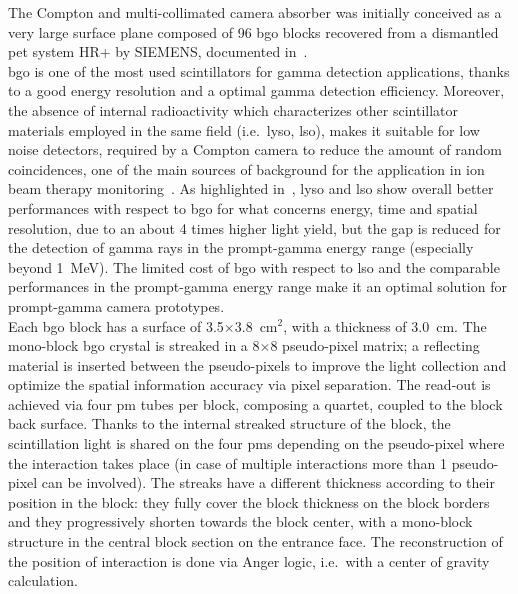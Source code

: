 The Compton and multi-collimated camera absorber was initially conceived as a very large surface plane composed of 96 \gls{bgo} blocks recovered from a dismantled \gls{pet} system HR+ by SIEMENS, documented in~\parencite{Adam1997, Brix1997}.\\ 
\gls{bgo} is one of the most used scintillators for gamma detection applications, thanks to a good energy resolution and a optimal gamma detection efficiency. Moreover, the absence of internal radioactivity which characterizes other scintillator materials employed in the same field (i.e.~\gls{lyso}, \gls{lso}), makes it suitable for low noise detectors, required by a Compton camera to reduce the amount of random coincidences, one of the main sources of background for the application in ion beam therapy monitoring~\parencite{Ortega2015}. As highlighted in~\parencite{HuesoGonzalez2015}, \gls{lyso} and \gls{lso} show overall better performances with respect to \gls{bgo} for what concerns energy, time and spatial resolution, due to an about 4 times higher light yield, but the gap is reduced for the detection of gamma rays in the prompt-gamma energy range (especially beyond 1~MeV). The limited cost of \gls{bgo} with respect to \gls{lso} and the comparable performances in the prompt-gamma energy range make it an optimal solution for prompt-gamma camera prototypes.\\
Each \gls{bgo} block has a surface of 3.5$\times$3.8~cm$^2$, with a thickness of 3.0~cm. The mono-block \gls{bgo} crystal is streaked in a 8$\times$8 pseudo-pixel matrix; a reflecting material is inserted between the pseudo-pixels to improve the light collection and optimize the spatial information accuracy via pixel separation. The read-out is achieved via four \gls{pm} tubes per block, composing a quartet, coupled to the block back surface. Thanks to the internal streaked structure of the block, the scintillation light is shared on the four \glspl{pm} depending on the pseudo-pixel where the interaction takes place (in case of multiple interactions more than 1 pseudo-pixel can be involved). The streaks have a different thickness according to their position in the block: they fully cover the block thickness on the block borders and they progressively shorten towards the block center, with a mono-block structure in the central block section on the entrance face. The reconstruction of the position of interaction is done via Anger logic, i.e.~with a center of gravity calculation.\\
